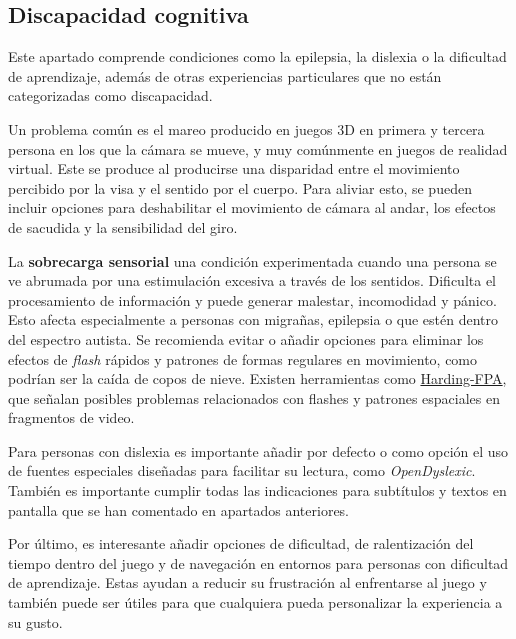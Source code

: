 \subsection{Discapacidad cognitiva}

Este apartado comprende condiciones como la epilepsia, la dislexia o la dificultad de aprendizaje, además de otras experiencias particulares que no están categorizadas como discapacidad.

Un problema común es el mareo producido en juegos 3D en primera y tercera persona en los que la cámara se mueve, y muy comúnmente en juegos de realidad virtual. Este se produce al producirse una disparidad entre el movimiento percibido por la visa y el sentido por el cuerpo. Para aliviar esto, se pueden incluir opciones para deshabilitar el movimiento de cámara al andar, los efectos de sacudida y la sensibilidad del giro.

La \textbf{sobrecarga sensorial} una condición experimentada cuando una persona se ve abrumada por una estimulación excesiva a través de los sentidos. Dificulta el procesamiento de información y puede generar malestar, incomodidad y pánico. Esto afecta especialmente a personas con migrañas, epilepsia o que estén dentro del espectro autista. Se recomienda evitar o añadir opciones para eliminar los efectos de \textit{flash} rápidos y patrones de formas regulares en movimiento, como podrían ser la caída de copos de nieve. Existen herramientas como \href{https://www.hardingfpa.com/}{Harding-FPA}, que señalan posibles problemas relacionados con flashes y patrones espaciales en fragmentos de video.

Para personas con dislexia es importante añadir por defecto o como opción el uso de fuentes especiales diseñadas para facilitar su lectura, como \textit{OpenDyslexic}. También es importante cumplir todas las indicaciones para subtítulos y textos en pantalla que se han comentado en apartados anteriores.

Por último, es interesante añadir opciones de dificultad, de ralentización del tiempo dentro del juego y de navegación en entornos para personas con dificultad de aprendizaje. Estas ayudan a reducir su frustración al enfrentarse al juego y también puede ser útiles para que cualquiera pueda personalizar la experiencia a su gusto.
